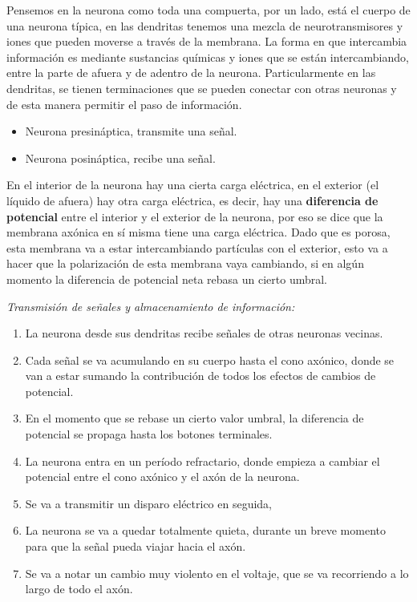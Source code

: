  Pensemos en la neurona como toda una compuerta, por un lado, está el cuerpo de una neurona típica, en las dendritas tenemos una mezcla de neurotransmisores y iones que pueden moverse a través de la membrana. La forma en que intercambia información es mediante sustancias químicas y iones que se están intercambiando, entre la parte de afuera y de adentro de la neurona. Particularmente en las dendritas, se tienen terminaciones que se pueden conectar con otras neuronas y de esta manera permitir el paso de información. 
 
 \begin{itemize}
  \item Neurona presináptica, transmite una señal.
  \item Neurona posináptica, recibe una señal.
 \end{itemize}  
 
En el interior de la neurona hay una cierta carga eléctrica, en el exterior (el líquido de afuera) hay otra carga eléctrica, es decir, hay una \textbf{diferencia de potencial} entre el interior y el exterior de la neurona, por eso se dice que la membrana axónica en sí misma tiene una carga eléctrica. Dado que es porosa, esta membrana  va a estar intercambiando partículas con el exterior, esto va a hacer que la polarización de esta membrana vaya cambiando, si en algún momento la diferencia de potencial neta rebasa un cierto umbral.




\emph{Transmisión de señales y almacenamiento de información:}


\begin{enumerate}
 \item La neurona desde sus dendritas recibe señales de otras neuronas vecinas.
 \item Cada señal se va acumulando en su cuerpo hasta el cono axónico, donde se van a estar sumando la contribución de todos los efectos de cambios de potencial.
 \item En el momento que se rebase un cierto valor umbral, la diferencia de potencial se propaga hasta los botones terminales.
 \item La neurona entra en un período refractario, donde empieza a cambiar el potencial entre el cono axónico y el axón de la neurona.
 \item Se va a transmitir un disparo eléctrico en seguida,
 \item La neurona se va a quedar totalmente quieta, durante un breve momento para que la señal pueda viajar hacia el axón.
 \item Se va a notar un cambio muy violento en el voltaje, que se va recorriendo a lo largo de todo el axón. 
\end{enumerate}


